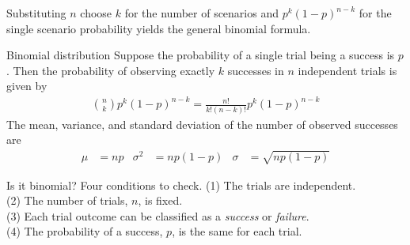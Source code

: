 Substituting $n$ choose $k$ for the number of scenarios
and $p^k(1-p)^{n-k}$ for the single scenario probability
yields the general binomial formula.

\begin{onebox}{Binomial distribution}
  Suppose the probability of a single trial being
  a success is $p$.
  Then the probability of observing exactly $k$ successes
  in $n$ independent trials is given by\vspace{-1mm}
  \begin{align*}
  {n\choose k}p^k(1-p)^{n-k} = \frac{n!}{k!(n-k)!}p^k(1-p)^{n-k}
  \end{align*}
  The mean, variance, and standard deviation
  of the number of observed successes are\vspace{-2mm}
  \begin{align*}
  \mu &= np
  &\sigma^2 &= np(1-p)
  &\sigma&= \sqrt{np(1-p)}
  \end{align*}
\end{onebox}

\begin{onebox}{Is it binomial? Four conditions to check.}
  \label{isItBinomialTipBox}%
  (1) The trials are independent. \\
  (2) The number of trials, $n$, is fixed. \\
  (3) Each trial outcome can be classified as a \emph{success}
      or \emph{failure}. \\
  (4) The probability of a success, $p$, is the same for
      each trial.
\end{onebox}

\D{\newpage}

